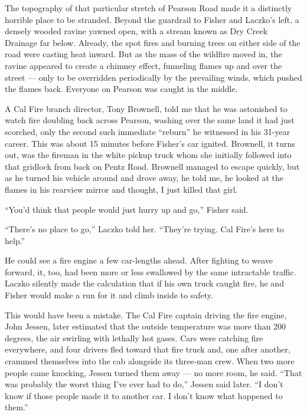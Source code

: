 The topography of that particular stretch of Pearson Road made it a
distinctly horrible place to be stranded. Beyond the guardrail to Fisher
and Laczko's left, a densely wooded ravine yawned open, with a stream
known as Dry Creek Drainage far below. Already, the spot fires and
burning trees on either side of the road were casting heat inward. But
as the mass of the wildfire moved in, the ravine appeared to create a
chimney effect, funneling flames up and over the street --- only to be
overridden periodically by the prevailing winds, which pushed the flames
back. Everyone on Pearson was caught in the middle.

A Cal Fire branch director, Tony Brownell, told me that he was
astonished to watch fire doubling back across Pearson, washing over the
same land it had just scorched, only the second such immediate
``reburn'' he witnessed in his 31-year career. This was about 15 minutes
before Fisher's car ignited. Brownell, it turns out, was the fireman in
the white pickup truck whom she initially followed into that gridlock
from back on Pentz Road. Brownell managed to escape quickly, but as he
turned his vehicle around and drove away, he told me, he looked at the
flames in his rearview mirror and thought, I just killed that girl.

``You'd think that people would just hurry up and go,'' Fisher said.

``There's no place to go,'' Laczko told her. ``They're trying. Cal
Fire's here to help.''

He could see a fire engine a few car-lengths ahead. After fighting to
weave forward, it, too, had been more or less swallowed by the same
intractable traffic. Laczko silently made the calculation that if his
own truck caught fire, he and Fisher would make a run for it and climb
inside to safety.

This would have been a mistake. The Cal Fire captain driving the fire
engine, John Jessen, later estimated that the outside temperature was
more than 200 degrees, the air swirling with lethally hot gases. Cars
were catching fire everywhere, and four drivers fled toward that fire
truck and, one after another, crammed themselves into the cab alongside
its three-man crew. When two more people came knocking, Jessen turned
them away --- no more room, he said. ``That was probably the worst thing
I've ever had to do,'' Jessen said later. ``I don't know if those people
made it to another car. I don't know what happened to them.''

